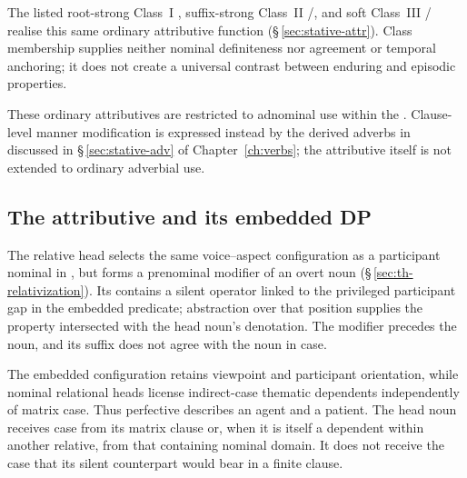 The listed root-strong Class~I , suffix-strong Class~II
/, and soft Class~III
/ realise this same ordinary attributive
function (§\,\ref{sec:stative-attr}). Class membership supplies neither
nominal definiteness nor agreement or temporal anchoring; it does not create
a universal contrast between enduring and episodic properties.

\noindent These ordinary attributives are restricted to adnominal use within
the . Clause-level manner modification is expressed instead by the
derived adverbs in  discussed in §\,\ref{sec:stative-adv} of
Chapter~\ref{ch:verbs}; the attributive itself is not extended to ordinary
adverbial use.

\subsection{The  attributive and its embedded DP}
\label{sec:nm-ovni}

The relative head  selects the same voice--aspect
configuration as a participant nominal in , but forms a prenominal
modifier of an overt noun (§\,\ref{sec:th-relativization}). Its
 contains a silent operator linked to the privileged participant
gap in the embedded predicate; abstraction over that position supplies the
property intersected with the head noun's denotation. The modifier precedes the
noun, and its suffix does not agree with the noun in case.

The embedded configuration retains viewpoint and participant orientation,
while nominal relational heads license indirect-case thematic dependents
independently of matrix case. Thus perfective  describes an
agent and  a patient. The head noun receives case from its
matrix clause or, when it is itself a dependent within another relative,
from that containing nominal domain. It does not receive the case that its
silent counterpart would bear in a finite clause.

\pex
\a {} 
\a {}
\xe

